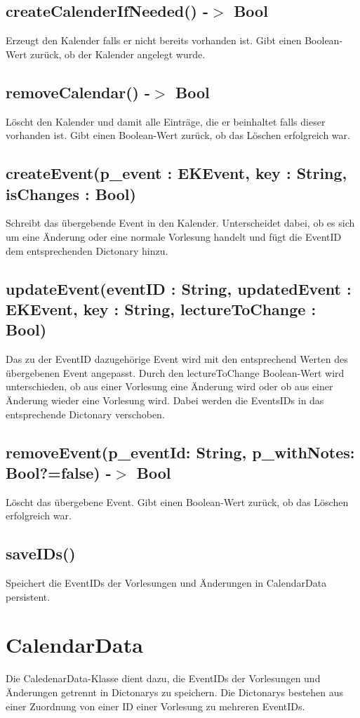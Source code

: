 \subsection[createCalenderIfNeeded]{createCalenderIfNeeded() -$>$ Bool}
Erzeugt den Kalender falls er nicht bereits vorhanden ist. Gibt einen Boolean-Wert zurück, ob der Kalender angelegt wurde.

\subsection[removeCalendar]{removeCalendar() -$>$ Bool}
Löscht den Kalender und damit alle Einträge, die er beinhaltet falls dieser vorhanden ist. Gibt einen Boolean-Wert zurück, ob das Löschen erfolgreich war.

\subsection[createEvent]{createEvent(p\_event : EKEvent, key : String, isChanges : Bool)}
Schreibt das übergebende Event in den Kalender. Unterscheidet dabei, ob es sich um eine Änderung oder eine normale Vorlesung handelt und fügt die EventID dem entsprechenden Dictonary hinzu. 

\subsection[updateEvent]{updateEvent(eventID : String, updatedEvent : EKEvent, key : String, lectureToChange : Bool)}
Das zu der EventID dazugehörige Event wird mit den entsprechend Werten des übergebenen Event angepasst. Durch den lectureToChange Boolean-Wert wird unterschieden, ob aus einer Vorlesung eine Änderung wird oder ob aus einer Änderung wieder eine Vorlesung wird. Dabei werden die EventsIDs in das entsprechende Dictonary verschoben.

\subsection[removeEvent]{removeEvent(p\_eventId: String, p\_withNotes: Bool?=false) -$>$ Bool}
Löscht das übergebene Event. Gibt einen Boolean-Wert zurück, ob das Löschen erfolgreich war.

\subsection[saveIDs]{saveIDs()}
Speichert die EventIDs der Vorlesungen und Änderungen in CalendarData persistent.

\newpage
\section{CalendarData}
Die CaledenarData-Klasse dient dazu, die EventIDs der Vorlesungen und Änderungen getrennt in Dictonarys zu speichern.
Die Dictonarys bestehen aus einer Zuordnung von einer ID einer Vorlesung zu mehreren EventIDs.

